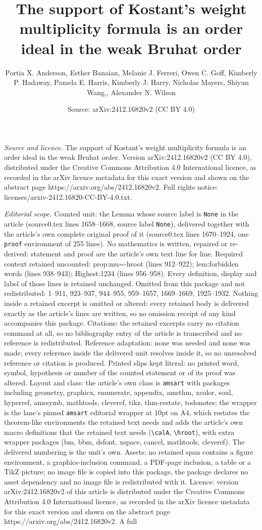 \documentclass[10pt,a4paper]{amsart}
\title[The support of Kostant's weight multiplicity formula is an o]{The support of Kostant's weight multiplicity formula is an order ideal in the weak Bruhat order}
\author{Portia X. Anderson, Esther Banaian, Melanie J. Ferreri, Owen C. Goff, Kimberly P. Hadaway, Pamela E. Harris, Kimberly J. Harry, Nicholas Mayers, Shiyun Wang,, Alexander N. Wilson}
\date{Source: arXiv:2412.16820v2 (CC BY 4.0)}
\begin{document}
\maketitle

\noindent\emph{Source and licence.} The support of Kostant's weight multiplicity formula is an order ideal in the weak Bruhat order. Version arXiv:2412.16820v2 (CC BY 4.0), distributed under the Creative Commons Attribution 4.0 International licence, as recorded in the arXiv licence metadata for this exact version and shown on the abstract page https://arxiv.org/abs/2412.16820v2. Full rights notice: licenses/arxiv-2412.16820-CC-BY-4.0.txt.\par\smallskip

\noindent\textit{Editorial scope.} Counted unit: the Lemma whose source label is \texttt{None} in the article (source0.tex lines 1658--1668, source label \texttt{None}), delivered together with the article's own complete original proof of it (source0.tex lines 1670--1924, one \texttt{proof} environment of 255 lines). No mathematics is written, repaired or re-derived: statement and proof are the article's own text line for line. Required context retained uncounted: prop:mu=-hroot (lines 912--922); lem:forbidden words (lines 938--943); Highest:1234 (lines 956--958). Every definition, display and label of those lines is retained unchanged. Omitted from this package and not redistributed: 1--911, 923--937, 944--955, 959--1657, 1669--1669, 1925--1932. Nothing inside a retained excerpt is omitted or altered: every retained body is delivered exactly as the article's lines are written, so no omission receipt of any kind accompanies this package. Citations: the retained excerpts carry no citation command at all, so no bibliography entry of the article is transcribed and no reference is redistributed. Reference adaptation: none was needed and none was made; every reference inside the delivered unit resolves inside it, so no unresolved reference or citation is produced. Printed slips kept literal: no printed word, symbol, hypothesis or number of the counted statement or of its proof was altered. Layout and class: the article's own class is \texttt{amsart} with packages including geometry, graphicx, enumerate, appendix, amsthm, xcolor, soul, hyperref, amssymb, mathtools, cleveref, tikz, thm-restate, todonotes; the wrapper is the lane's pinned \texttt{amsart} editorial wrapper at 10pt on A4, which restates the theorem-like environments the retained text needs and adds the article's own macro definitions that the retained text needs (\texttt{\textbackslash calA}, \texttt{\textbackslash hroot}), with extra wrapper packages (bm, bbm, dsfont, xspace, cancel, mathtools, cleveref). The delivered numbering is the unit's own. Assets: no retained span contains a figure environment, a graphics-inclusion command, a PDF-page inclusion, a table or a TikZ picture; no image file is copied into this package, the package declares no asset dependency and no image file is redistributed with it. Licence: version arXiv:2412.16820v2 of this article is distributed under the Creative Commons Attribution 4.0 International licence, as recorded in the arXiv licence metadata for this exact version and shown on the abstract page https://arxiv.org/abs/2412.16820v2. A full 
\end{document}

